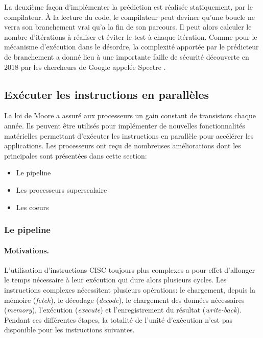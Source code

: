 La deuxième façon d'implémenter la prédiction est réalisée statiquement, par le compilateur. À la lecture du code, le compilateur peut deviner qu'une boucle ne verra son branchement vrai qu'a la fin de son parcours. Il peut alors calculer le nombre d’itérations à réaliser et éviter le test à chaque itération.
Comme pour le mécanisme d'exécution dans le désordre, la complexité apportée par le prédicteur de branchement a donné lieu à une importante faille de sécurité découverte en 2018 par les chercheurs de Google appelée Spectre \cite{kocher2018spectre}.






\subsection{Exécuter les instructions en parallèles} \label{sec:para}

La loi de Moore a assuré aux processeurs un gain constant de transistors chaque année. Ils peuvent être utilisés pour implémenter de nouvelles fonctionnalités matérielles permettant d'exécuter les instructions en parallèle pour accélérer les applications. Les processeurs ont reçu de nombreuses améliorations dont les principales sont présentées dans cette section: 
\begin{itemize}
    \item Le pipeline
    \item Les processeurs superscalaire
    \item Les coeurs
\end{itemize}


\subsubsection{Le pipeline} \label{sec:pipeline}


\paragraph{Motivations.} 

L'utilisation d'instructions CISC toujours plus complexes a pour effet d'allonger le temps nécessaire à leur exécution qui dure alors plusieurs cycles. Les instructions complexes nécessitent plusieurs opérations: le chargement, depuis la mémoire (\textit{fetch}), le décodage (\textit{decode}), le chargement des données nécessaires (\textit{memory}), l'exécution (\textit{execute}) et l'enregistrement du résultat (\textit{write-back}). Pendant ces différentes étapes, la totalité de l'unité d'exécution n'est pas disponible pour les instructions suivantes. 

